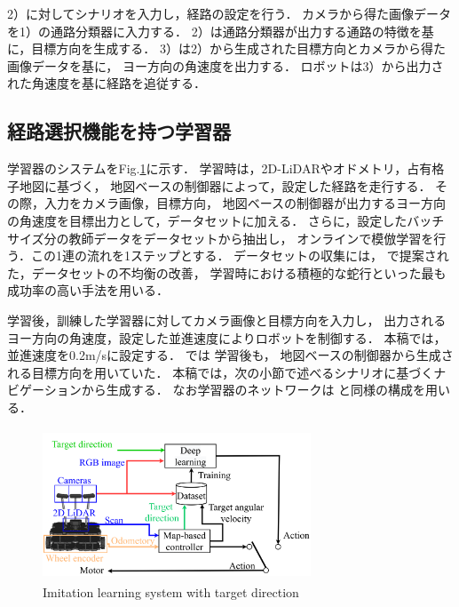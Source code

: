 \documentclass{sice-si}
\begin{document}
2）に対してシナリオを入力し，経路の設定を行う．
カメラから得た画像データを1）の通路分類器に入力する．
2）は通路分類器が出力する通路の特徴を基に，目標方向を生成する．
3）は2）から生成された目標方向とカメラから得た画像データを基に，
ヨー方向の角速度を出力する．
ロボットは3）から出力された角速度を基に経路を追従する．


\subsection{経路選択機能を持つ学習器}
学習器のシステムをFig.\ref{fig:learning}に示す．
学習時は，2D-LiDARやオドメトリ，占有格子地図に基づく，
地図ベースの制御器によって，設定した経路を走行する．
その際，入力をカメラ画像，目標方向，
地図ベースの制御器が出力するヨー方向の角速度を目標出力として，データセットに加える．
さらに，設定したバッチサイズ分の教師データをデータセットから抽出し，
オンラインで模倣学習を行う．この1連の流れを1ステップとする．
データセットの収集には，
\cite{fujiwara2023}
で提案された，データセットの不均衡の改善，
学習時における積極的な蛇行といった最も成功率の高い手法を用いる．\par
学習後，訓練した学習器に対してカメラ画像と目標方向を入力し，
出力されるヨー方向の角速度，設定した並進速度によりロボットを制御する．
本稿では，並進速度を0.2m/sに設定する．
\cite{haruyama2022}\cite{fujiwara2023}では
学習後も，
地図ベースの制御器から生成される目標方向を用いていた．
本稿では，次の小節で述べるシナリオに基づくナビゲーションから生成する．
なお学習器のネットワークは
\cite{haruyama2022}\cite{fujiwara2023}
と同様の構成を用いる．
\begin{figure}[h!]
    \centering
     \includegraphics[height=45mm,width=80mm]{./figs/lerning_sys.png}
     \caption{Imitation learning system with target direction}\label{fig:learning}
\end{figure}
\end{document}

